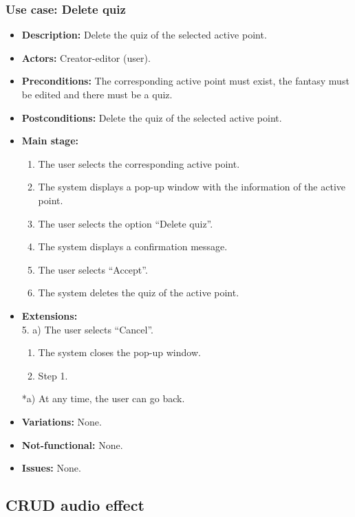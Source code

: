 \subsubsection{Use case: Delete quiz}
\begin{itemize}
	\item \textbf{Description:} Delete the quiz of the selected active point.
	\item \textbf{Actors:} Creator-editor (user).
	\item \textbf{Preconditions:} The corresponding active point must exist, the fantasy must be edited and there must be a quiz.
	\item \textbf{Postconditions:} Delete the quiz of the selected active point.
	\item \textbf{Main stage:}
	\begin{enumerate}
		\item The user selects the corresponding active point.
		\item The system displays a pop-up window with the information of the active point.
		\item The user selects the option ``Delete quiz''.
		\item The system displays a confirmation message.
		\item The user selects ``Accept''.
		\item The system deletes the quiz of the active point.
	\end{enumerate}
	\item \textbf{Extensions:} \\ 5. a) The user selects ``Cancel''.
	\begin{enumerate}
		\item The system closes the pop-up window.
		\item Step 1.
	\end{enumerate}
	*a) At any time, the user can go back.
	\item \textbf{Variations:} None.
	\item \textbf{Not-functional:} None.
	\item \textbf{Issues:} None.
\end{itemize}

\subsection{CRUD audio effect}
\hypertarget{crearaudio}{}
